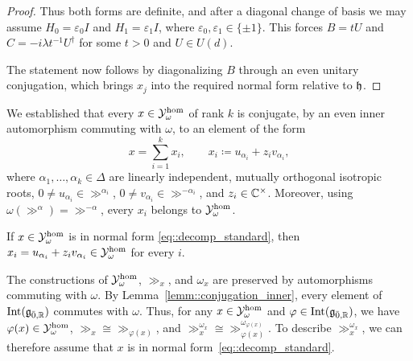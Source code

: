 \begin{proof}
Thus both forms are definite, and after a diagonal change of basis we may assume $H_0=\varepsilon_0 I$ and $H_1=\varepsilon_1 I$, where $\varepsilon_0,\varepsilon_1\in\{\pm1\}$. This forces $B=tU$ and $C=-i\lambda t^{-1}U^\dagger$ for some $t>0$ and $U\in U(d)$.

The statement now follows by diagonalizing $B$ through an even unitary conjugation, which brings $x_j$ into the required normal form relative to ${\mathfrak h}$.
\end{proof}

We established that every $x\in{\mathcal Y}_\omega^{\hom}$ of rank $k$ is conjugate, by an even inner automorphism commuting with $\omega$, to an element of the form
\begin{equation}\label{eq::decomp_standard}
x=\sum_{i=1}^{k}x_i,
\qquad
x_i\coloneqq u_{\alpha_i}+z_i v_{\alpha_i},
\end{equation}
where $\alpha_1,\ldots,\alpha_k\in\Delta$ are linearly independent, mutually orthogonal isotropic roots, $0\neq u_{\alpha_i}\in\gg^{\alpha_i}$, $0\neq v_{\alpha_i}\in\gg^{-\alpha_i}$, and $z_i\in{\mathbb C}^\times$. Moreover, using $\omega(\gg^{\alpha})=\gg^{-\alpha}$, every $x_i$ belongs to ${\mathcal Y}_\omega^{\hom}$.

\begin{lemma}\label{lemm::omega_root_pairs}
If $x\in{\mathcal Y}_\omega^{\hom}$ is in normal form
\eqref{eq::decomp_standard}, then
$
x_i= u_{\alpha_i}+z_i v_{\alpha_i}
\in{\mathcal Y}_\omega^{\hom}
$
for every $i$.
\end{lemma}


The constructions of ${\mathcal Y}_\omega^{\hom}$, $\gg_x$, and $\omega_x$ are preserved by automorphisms commuting with $\omega$. By Lemma~\ref{lemm::conjugation_inner}, every element of $\operatorname{Int}({\mathfrak{g}}_{\bar0,{\mathbb R}})$ commutes with $\omega$. Thus, for any $x\in{\mathcal Y}_\omega^{\hom}$ and $\varphi\in\operatorname{Int}({\mathfrak{g}}_{\bar0,{\mathbb R}})$, we have $\varphi(x)\in{\mathcal Y}_\omega^{\hom}$, $\gg_x\cong\gg_{\varphi(x)}$, and $\gg_x^{\omega_x}\cong\gg_{\varphi(x)}^{\omega_{\varphi(x)}}$. To describe $\gg_x^{\omega_x}$, we can therefore assume that $x$ is in normal form~\eqref{eq::decomp_standard}.


